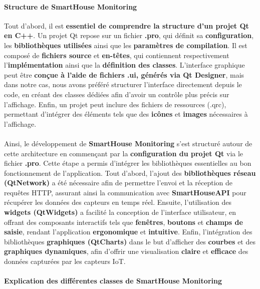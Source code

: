 \documentclass[10pt, a4paper]{report}
\begin{document}
	\paragraph{Structure de SmartHouse Monitoring\\}
		Tout d'abord, il est \textbf{essentiel de comprendre la structure d’un projet Qt en C++}. Un projet Qt repose sur un fichier \textbf{.pro}, qui définit sa \textbf{configuration}, les \textbf{bibliothèques utilisées} ainsi que les \textbf{paramètres de compilation}. Il est composé de \textbf{fichiers source} et \textbf{en-têtes}, qui contiennent respectivement l’\textbf{implémentation} ainsi que la \textbf{définition des classes}. L’interface graphique peut être \textbf{conçue à l’aide de fichiers .ui, générés via Qt Designer}, mais dans notre cas, nous avons préféré structurer l’interface directement depuis le code, en créant des classes dédiées afin d'avoir un contrôle plus précis sur l’affichage. Enfin, un projet peut inclure des fichiers de ressources (.qrc), permettant d’intégrer des éléments tels que des \textbf{icônes} et \textbf{images} nécessaires à l'affichage.\\\\
		Ainsi, le développement de \textbf{SmartHouse Monitoring} s'est structuré autour de cette architecture en commençant par la \textbf{configuration du projet Qt} via le fichier \textbf{.pro}. Cette étape a permis d’intégrer les bibliothèques essentielles au bon fonctionnement de l’application. Tout d’abord, l’ajout des \textbf{bibliothèques réseau (QtNetwork)} a été nécessaire afin de permettre l’envoi et la réception de requêtes HTTP, assurant ainsi la communication avec \textbf{SmartHouseAPI} pour récupérer les données des capteurs en temps réel. Ensuite, l’utilisation des\textbf{ widgets (QtWidgets)} a facilité la conception de l’interface utilisateur, en offrant des composants interactifs tels que \textbf{fenêtres}, \textbf{boutons} et \textbf{champs de saisie}, rendant l’application \textbf{ergonomique} et \textbf{intuitive}. Enfin, l’intégration des bibliothèques \textbf{graphiques (QtCharts)} dans le but d'afficher des \textbf{courbes} et des \textbf{graphiques dynamiques}, afin d'offrir une visualisation \textbf{claire} et \textbf{efficace} des données capturées par les capteurs IoT.
		
	\paragraph{Explication des différentes classes de SmartHouse Monitoring\\}
	
\end{document}

